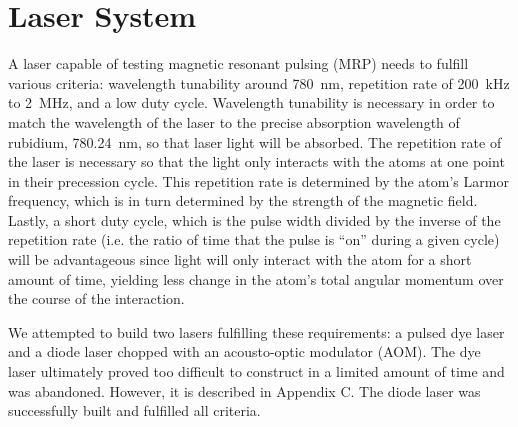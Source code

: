 



\chapter{Laser System}

A laser capable of testing magnetic resonant pulsing (MRP) needs to fulfill various criteria: wavelength tunability around \SI{780}{\nano \meter}, repetition rate of \SI{200}{ kHz} to \SI{2}{ MHz}, and a low duty cycle. Wavelength tunability is necessary in order to match the wavelength of the laser to the precise absorption wavelength of rubidium, \SI{780.24}{\nano \meter}, so that laser light will be absorbed. The repetition rate of the laser is necessary so that the light only interacts with the atoms at one point in their precession cycle. This repetition rate is determined by the atom's Larmor frequency, which is in turn determined by the strength of the magnetic field. Lastly, a short duty cycle, which is the pulse width divided by the inverse of the repetition rate (i.e. the ratio of time that the pulse is ``on'' during a given cycle) will be advantageous since light will only interact with the atom for a short amount of time, yielding less change in the atom's total angular momentum over the course of the interaction.

We attempted to build two lasers fulfilling these requirements: a pulsed dye laser and a diode laser chopped with an acousto-optic modulator (AOM). The dye laser ultimately proved too difficult to construct in a limited amount of time and was abandoned. However, it is described in Appendix C. The diode laser was successfully built and fulfilled all criteria.





